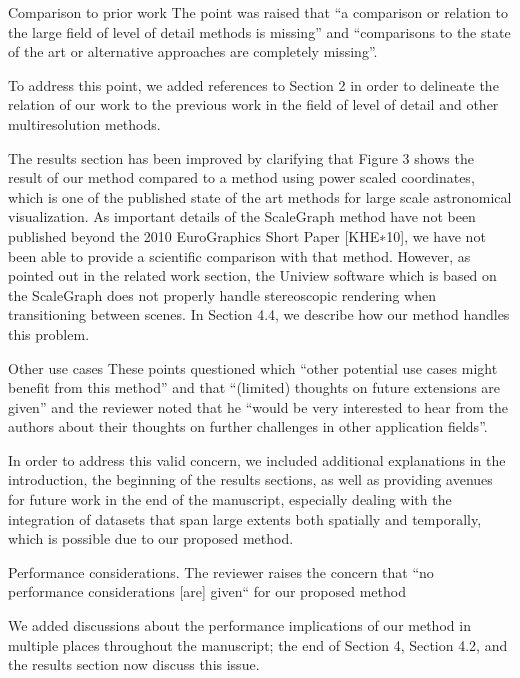 \documentclass{article}
\begin{document}
\vspace*{1cm}


\begin{tcolorbox}
{\large Comparison to prior work}  The point was raised that ``a comparison or relation to the large field of level of detail methods is missing'' and ``comparisons to the state of the art or alternative approaches are completely missing''.
\end{tcolorbox}
To address this point, we added references to Section 2 in order to delineate the relation of our work to the previous work in the field of level of detail and other multiresolution methods.

The results section has been improved by clarifying that Figure 3 shows the result of our method compared to a method using power scaled coordinates, which is one of the published state of the art methods for large scale astronomical visualization.
As important details of the ScaleGraph method have not been published beyond the 2010 EuroGraphics Short Paper [KHE∗10], we have not been able to provide a scientific comparison with that method.
However, as pointed out in the related work section, the Uniview software which is based on the ScaleGraph does not properly handle stereoscopic rendering when transitioning between scenes.
In Section 4.4, we describe how our method handles this problem.

\vspace*{1cm}

\begin{tcolorbox}
{\large Other use cases} These points questioned which ``other potential use cases might benefit from this method'' and that ``(limited) thoughts on future extensions are given'' and the reviewer noted that he ``would be very interested to hear from the authors about their thoughts on further challenges in other application fields''.
\end{tcolorbox}
In order to address this valid concern, we included additional explanations in the
introduction, the beginning of the results sections, as well as providing avenues for
future work in the end of the manuscript, especially dealing with the integration of datasets that span large extents both spatially and temporally, which is possible due to our proposed method.

\vspace*{1cm}

\begin{tcolorbox}
{\large Performance considerations}. The reviewer raises the concern that ``no performance considerations [are] given`` for our proposed method
\end{tcolorbox}
We added discussions about the performance implications of our method in multiple places throughout the manuscript; the end of Section 4, Section 4.2, and the results section now discuss this issue.
\end{document}
